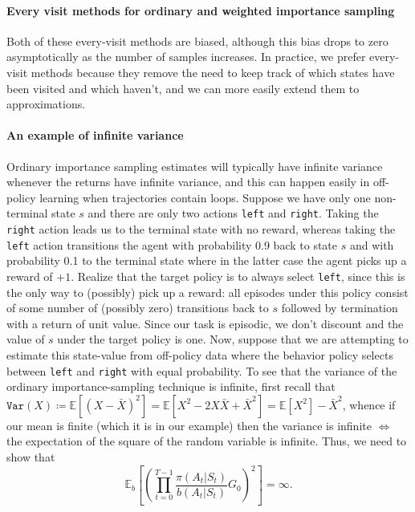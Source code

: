 \documentclass[12pt]{article}
\begin{document}
\paragraph{Every visit methods for ordinary and weighted importance sampling} Both of these every-visit methods are biased, although this bias drops to zero asymptotically as the number of samples increases. In practice, we prefer every-visit methods because they remove the need to keep track of which states have been visited and which haven't, and we can more easily extend them to approximations.

\paragraph{An example of infinite variance} Ordinary importance sampling estimates will typically have infinite variance whenever the returns have infinite variance, and this can happen easily in off-policy learning when trajectories contain loops. Suppose we have only one non-terminal state $s$ and there are only two actions \texttt{left} and \texttt{right}. Taking the \texttt{right} action leads us to the terminal state with no reward, whereas taking the \texttt{left} action transitions the agent with probability 0.9 back to state $s$ and with probability 0.1 to the terminal state where in the latter case the agent picks up a reward of $+1$. Realize that the target policy is to always select \texttt{left}, since this is the only way to (possibly) pick up a reward: all episodes under this policy consist of some number of (possibly zero) transitions back to $s$ followed by termination with a return of unit value. Since our task is episodic, we don't discount and the value of $s$ under the target policy is one. Now, suppose that we are attempting to estimate this state-value from off-policy data where the behavior policy selects between \texttt{left} and \texttt{right} with equal probability. To see that the variance of the ordinary importance-sampling technique is infinite, first recall that $\texttt{Var}(X) \coloneqq \mathbb E \left[ (X - \bar{X})^2 \right] = \mathbb E \left[X^2 - 2X \bar{X} + \bar{X}^2\right] = \mathbb E \left[X^2\right]  - \bar{X}^2$, whence if our mean is finite (which it is in our example) then the variance is infinite $\iff$ the expectation of the square of the random variable is infinite. Thus, we need to show that
\[
  \mathbb E_b \left[ \left( \prod_{t=0}^{T-1} \frac{\pi(A_t|S_t)}{b(A_t|S_t)} G_0 \right)^2 \right] = \infty.
\]
\end{document}
